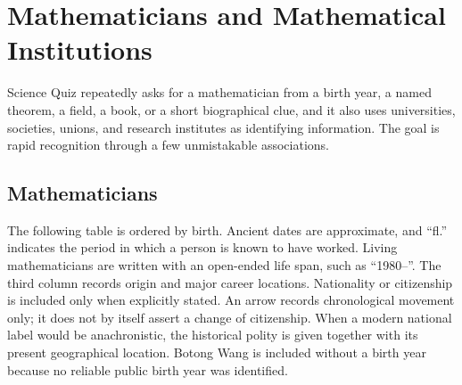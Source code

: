     \chapter{Mathematicians and Mathematical Institutions}

    Science Quiz repeatedly asks for a mathematician from a birth year, a named
    theorem, a field, a book, or a short biographical clue, and it also uses
    universities, societies, unions, and research institutes as identifying
    information. The goal is rapid recognition through a few unmistakable
    associations.

    \section*{Mathematicians}

    The following table is ordered by birth. Ancient dates are approximate, and
    ``fl.'' indicates the period in which a person is known to have worked.
    Living mathematicians are written with an open-ended life span, such as
    ``1980--''. The third column records origin and major career locations.
    Nationality or citizenship is included only when explicitly stated. An
    arrow records chronological movement only; it does not by
    itself assert a change of citizenship. When a modern national label would
    be anachronistic, the historical polity is given together with its present
    geographical location. Botong Wang is included without a birth year because
    no reliable public birth year was identified.

    \vspace{1em}

